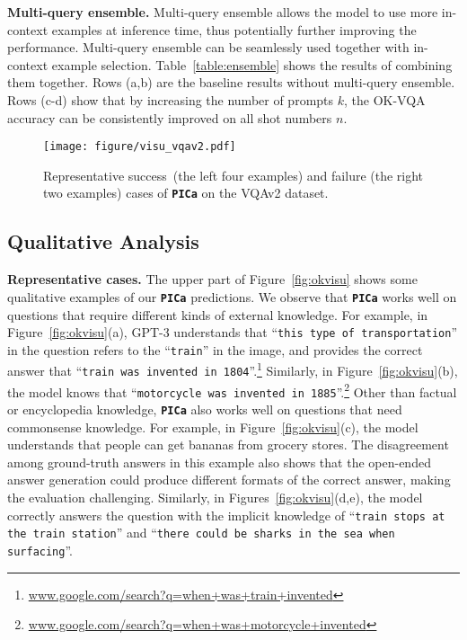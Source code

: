 \vspace{2mm}
\noindent\textbf{Multi-query ensemble.}
Multi-query ensemble allows the model to use more in-context examples at inference time, thus potentially further improving the performance. Multi-query ensemble can be seamlessly used together with in-context example selection. Table~\ref{table:ensemble} shows the results of combining them together. Rows (a,b) are the baseline results without multi-query ensemble. Rows (c-d) show that by increasing the number of prompts $k$, the OK-VQA accuracy can be consistently improved on all shot numbers $n$.


\begin{figure*}[t]
\begin{center}
  \centerline{\texttt{[image: figure/visu\_vqav2.pdf]}}
\end{center}
\vspace{-0.3in}
    \caption{\small Representative success~(the left four examples) and failure (the right two examples) cases of \textbf{\texttt{PICa}} on the VQAv2 dataset.
	}
\vspace{-0.1in}
\label{fig:vqavisu}
\end{figure*}

\subsection{Qualitative Analysis}
\label{sec:example}

\noindent\textbf{Representative cases.}
The upper part of Figure~\ref{fig:okvisu} shows some qualitative examples of our \textbf{\texttt{PICa}} predictions. We observe that \textbf{\texttt{PICa}} works well on questions that require different kinds of external knowledge. For example, in Figure~\ref{fig:okvisu}(a), GPT-3 understands that ``\texttt{this type of transportation}'' in the question refers to the ``\texttt{train}'' in the image, and provides the correct answer that ``\texttt{train was invented in 1804}''.\footnote{\url{www.google.com/search?q=when+was+train+invented}} Similarly, in Figure~\ref{fig:okvisu}(b), the model knows that ``\texttt{motorcycle was invented in 1885}''.\footnote{\url{www.google.com/search?q=when+was+motorcycle+invented}} Other than factual or encyclopedia knowledge, \textbf{\texttt{PICa}} also works well on questions that need commonsense knowledge. For example, in Figure~\ref{fig:okvisu}(c), the model understands that people can get bananas from grocery stores. The disagreement among ground-truth answers in this example also shows that the open-ended answer generation could produce different formats of the correct answer, making the evaluation challenging. Similarly, in Figures~\ref{fig:okvisu}(d,e), the model correctly answers the question with the implicit knowledge of ``\texttt{train stops at the train station}'' and ``\texttt{there could be sharks in the sea when surfacing}''.

